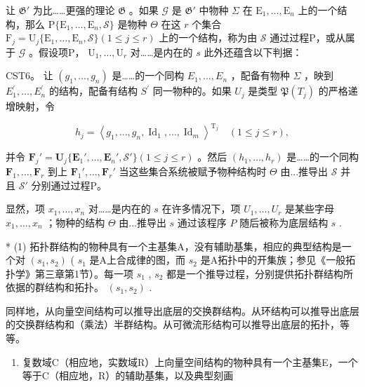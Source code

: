 让 \(\mathfrak{G}'\) 为比……更强的理论 \(\mathfrak{G}\) 。如果 \(\mathcal{G}\) 是 \(\mathfrak{G}'\) 中物种 \(\Sigma\) 在 \(\mathrm{E}_1, \ldots, \mathrm{E}_n\) 上的一个结构，那么 \(\mathrm{P}\{\mathrm{E}_1, \ldots, \mathrm{E}_n, \mathcal{S}\}\) 是物种 \(\Theta\) 在这 \(r\) 个集合 \(\mathrm{F}_j = \mathrm{U}_j\{\mathrm{E}_1, \ldots, \mathrm{E}_n, \mathcal{S}\}(1 \leqslant j \leqslant r)\) 上的一个结构，称为由 \(\mathcal{S}\) 通过过程P，或从属于 \(\mathcal{G}\) 。假设项P， \(\mathrm{U}_1, \ldots, \mathrm{U}_r\) 对……是内在的 \(s\) 此外还蕴含以下判据：

CST6。 让 \((g_{1}, \ldots, g_{n})\) 是……的一个同构 \(E_{1}, \ldots, E_{n}\) ，配备有物种 \(\Sigma\) ，映到 \(E_{1}^{\prime}, \ldots, E_{n}^{\prime}\) 的结构，配备有结构 \(S^{\prime}\) 同一物种的。如果 \(U_{j}\) 是类型 \(\mathfrak{P}(T_{j})\) 的严格递增映射，令

\[
h _ {j} = \left\langle g _ {1}, \dots , g _ {n}, \operatorname{Id} _ {1}, \dots , \operatorname{Id} _ {m} \right\rangle^ {\mathrm{T}_j} \quad (1 \leqslant j \leqslant r),
\]

并令 \(\mathbf{F}_j' = \mathbf{U}_j\{\mathbf{E}_1', \ldots, \mathbf{E}_n', \mathcal{S}'\} (1 \leqslant j \leqslant r)\) 。然后 \((h_1, \ldots, h_r)\) 是……的一个同构 \(\mathbf{F}_1, \ldots, \mathbf{F}_r\) 到上 \(\mathbf{F}_1', \ldots, \mathbf{F}_r'\) 当这些集合系统被赋予物种结构时 \(\Theta\) 由...推导出 \(\mathcal{S}\) 并且 \(\mathcal{S}'\) 分别通过过程P。

显然，项 \(x_{1}, \ldots, x_{n}\) 对……是内在的 \(s\) 在许多情况下，项 \(U_{1}, \ldots, U_{r}\) 是某些字母 \(x_{1}, \ldots, x_{n}\) ；物种的结构 \(\Theta\) 由...推导出 \(s\) 通过该程序 \(P\) 随后被称为底层结构 \(s\) .


* (1) 拓扑群结构的物种具有一个主基集A，没有辅助基集，相应的典型结构是一个对 \((s_1, s_2)\) ( \(s_1\) 是A上合成律的图，而 \(s_2\) 是A拓扑中的开集族；参见《一般拓扑学》第三章第1节）。每一项 \(s_1\) , \(s_2\) 都是一个推导过程，分别提供拓扑群结构所依据的群结构和拓扑。 \((s_1, s_2)\) .

同样地，从向量空间结构可以推导出底层的交换群结构。从环结构可以推导出底层的交换群结构和（乘法）半群结构。从可微流形结构可以推导出底层的拓扑，等等。

\begin{enumerate}
\def\labelenumi{(\arabic{enumi})}
\setcounter{enumi}{1}
\tightlist
\item
  复数域C（相应地，实数域R）上向量空间结构的物种具有一个主基集E，一个等于C（相应地，R）的辅助基集，以及典型刻画
\end{enumerate}

